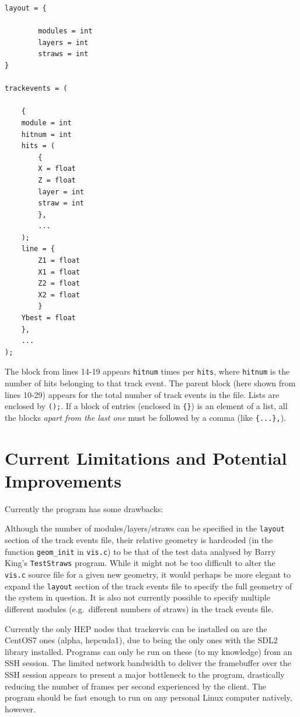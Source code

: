 \documentclass[12pt]{article}
\begin{document}
\begin{lstlisting}[caption=Track Events Input File Example.] 
layout = {

	    modules = int
	    layers = int
	    straws = int
}

trackevents = (

	{
	module = int
	hitnum = int
	hits = (
		{
		X = float
		Z = float
		layer = int
		straw = int
		},
		...
	);
	line = {
		Z1 = float
		X1 = float
		Z2 = float
		X2 = float
		}
	Ybest = float
	},
	...
);
\end{lstlisting}

The block from lines 14-19 appears \verb|hitnum| times per \verb|hits|, where \verb|hitnum| is the number of hits belonging to that track event. The parent block (here shown from lines 10-29) appears for the total number of track events in the file.\newline
Lists are enclosed by \verb|();|. If a block of entries (enclosed in \verb|{}|) is an element of a list, all the blocks \emph{apart from the last one} must be followed by a comma (like \verb|{...},|).

\section*{Current Limitations and Potential Improvements}

Currently the program has some drawbacks:\newline

Although the number of modules/layers/straws can be specified in the \verb|layout| section of the track events file, their relative geometry is hardcoded (in the function \verb|geom_init| in \verb|vis.c|) to be that of the test data analysed by Barry King's \verb|TestStraws| program. While it might not be too difficult to alter the \verb|vis.c| source file for a given new geometry, it would perhaps be more elegant to expand the \verb|layout| section of the track events file to specify the full geometry of the system in question. It is also not currently possible to specify multiple different modules (e.g.\ different numbers of straws) in the track events file.\newline

Currently the only HEP nodes that trackervis can be installed on are the CentOS7 ones (alpha, hepcuda1), due to being the only ones with the SDL2 library installed. Programs can only be run on these (to my knowledge) from an SSH session. The limited network bandwidth to deliver the framebuffer over the SSH session appears to present a major bottleneck to the program, drastically reducing the number of frames per second experienced by the client. The program should be fast enough to run on any personal Linux computer natively, however.
\end{document}
